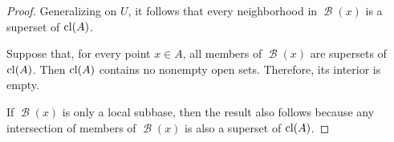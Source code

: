 \begin{proof}
  Generalizing on \( U \), it follows that every neighborhood in \( \mscrB(x) \) is a superset of \( \operatorname{cl}(A) \).

  \NecessitySubProof* Suppose that, for every point \( x \in A \), all members of \( \mscrB(x) \) are supersets of \( \operatorname{cl}(A) \). Then \( \operatorname{cl}(A) \) contains no nonempty open sets. Therefore, its interior is empty.

  If \( \mscrB(x) \) is only a local subbase, then the result also follows because any intersection of members of \( \mscrB(x) \) is also a superset of \( \operatorname{cl}(A) \).
\end{proof}

